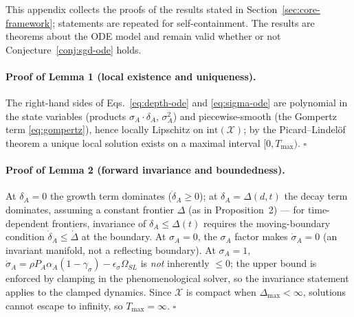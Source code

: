 \documentclass{article}
\theoremstyle{definition}
\begin{document}
This appendix collects the proofs of the results stated in
Section~\ref{sec:core-framework}; statements are repeated for
self-containment. The results are theorems about the ODE model and
remain valid whether or not Conjecture~\ref{conj:sgd-ode} holds.

\paragraph*{Proof of Lemma 1 (local existence and uniqueness).}
The right-hand sides of Eqs.~\eqref{eq:depth-ode} and
\eqref{eq:sigma-ode} are polynomial in the state variables (products
$\sigma_A \cdot \delta_A$, $\sigma_A^2$) and piecewise-smooth (the
Gompertz term \eqref{eq:gompertz}), hence locally Lipschitz on
$\text{int}(\mathcal{X})$; by the Picard--Lindel\"of theorem a unique
local solution exists on a maximal interval $[0, T_{\max})$.
$\square$

\paragraph*{Proof of Lemma 2 (forward invariance and boundedness).}
At $\delta_A = 0$ the growth term dominates ($\dot{\delta}_A \geq 0$);
at $\delta_A = \Delta(d,t)$ the decay term dominates, assuming a
constant frontier $\Delta$ (as in Proposition~2) --- for time-dependent
frontiers, invariance of $\delta_A \leq \Delta(t)$ requires the
moving-boundary condition $\dot{\delta}_A \leq \dot{\Delta}$ at the
boundary. At $\sigma_A = 0$, the $\sigma_A$ factor makes
$\dot{\sigma}_A = 0$ (an invariant manifold, not a reflecting
boundary). At $\sigma_A = 1$, $\dot{\sigma}_A = \rho P_A \alpha_A
(1 - \gamma_\sigma) - \epsilon_\sigma \Omega_{SL}$ is \emph{not}
inherently $\leq 0$; the upper bound is enforced by clamping in the
phenomenological solver, so the invariance statement applies to the
clamped dynamics. Since $\mathcal{X}$ is compact when
$\Delta_{\max} < \infty$, solutions cannot escape to infinity, so
$T_{\max} = \infty$. $\square$
\end{document}
